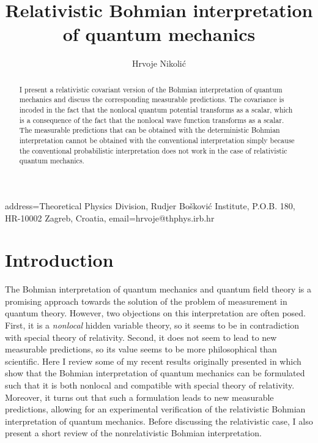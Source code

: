 \documentclass[10pt,twoside]{aipproc} %
\begin{document}
\title{Relativistic Bohmian interpretation of quantum mechanics}
\author{Hrvoje Nikoli\'c}{
  address={Theoretical Physics Division, Rudjer Bo\v{s}kovi\'{c} Institute,
           P.O.B. 180, HR-10002 Zagreb, Croatia},
  email={hrvoje@thphys.irb.hr}
}
\begin{abstract}
I present a relativistic covariant version of the Bohmian interpretation of
quantum mechanics and discuss the corresponding measurable predictions.
The covariance is incoded in the fact that the nonlocal quantum potential 
transforms as a scalar, which is a consequence of the fact 
that the nonlocal wave function transforms as a scalar. The  
measurable predictions that can be obtained with the deterministic 
Bohmian interpretation cannot be obtained with the conventional 
interpretation simply because the conventional probabilistic 
interpretation does not work in the case of relativistic 
quantum mechanics.
\end{abstract}

\maketitle

\section{Introduction}

The Bohmian interpretation of quantum mechanics and quantum field theory 
\cite{bohm,bohmPR1,bohmPR2,holPR,holbook} 
is a promising approach towards the solution of the 
problem of measurement in quantum theory. However, two objections 
on this interpretation are often posed. First, it is a {\em nonlocal}
hidden variable theory, so it seems to be in contradiction with
special theory of relativity.
Second, it does not seem to lead to new measurable predictions, so 
its value seems to be more philosophical than scientific. 
Here I review some of my recent results originally presented 
in \cite{nikolfpl1,nikolfpl3} which show 
that the Bohmian interpretation of quantum mechanics 
can be formulated such that 
it is both nonlocal and compatible with special theory of relativity.
Moreover, it turns out that such a formulation leads to 
new measurable predictions, allowing for an experimental 
verification of the relativistic Bohmian interpretation of 
quantum mechanics. Before discussing the relativistic case, 
I also present a short review of the nonrelativistic Bohmian interpretation. 
\end{document}

